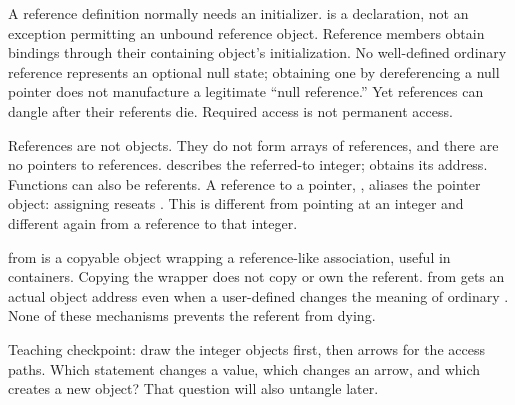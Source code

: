 A reference definition normally needs an initializer.  is a declaration, not an exception permitting an unbound reference object. Reference members obtain bindings through their containing object's initialization. No well-defined ordinary reference represents an optional null state; obtaining one by dereferencing a null pointer does not manufacture a legitimate ``null reference.'' Yet references can dangle after their referents die. Required access is not permanent access.

References are not objects. They do not form arrays of references, and there are no pointers to references.  describes the referred-to integer;  obtains its address. Functions can also be referents. A reference to a pointer, , aliases the pointer object: assigning  reseats . This is different from  pointing at an integer and different again from a reference to that integer.

 from  is a copyable object wrapping a reference-like association, useful in containers. Copying the wrapper does not copy or own the referent.  from  gets an actual object address even when a user-defined  changes the meaning of ordinary . None of these mechanisms prevents the referent from dying.

Teaching checkpoint: draw the integer objects first, then arrows for the access paths. Which statement changes a value, which changes an arrow, and which creates a new object? That question will also untangle  later.

